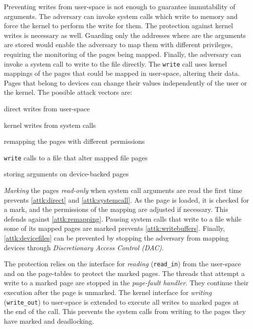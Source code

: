 \documentclass[conference]{IEEEtran}
\begin{document}
Preventing writes from user-space is not enough to guarantee immutability of
arguments. The adversary can invoke system calls which write to memory and force
the kernel to perform the write for them. The protection against kernel writes
is necessary as well. Guarding only the addresses where are the arguments are
stored would enable the adversary to map them with different privileges,
requiring the monitoring of the pages being mapped. Finally, the adversary can
invoke a system call to write to the file directly. The \texttt{write} call uses
kernel mappings of the pages that could be mapped in user-space, altering their
data. Pages that belong to devices can change their values independently of the 
user or the kernel. The possible attack vectors are:
\begin{enumerate*}[label=(\roman*)]
\item \label{attk:direct} direct writes from user-space
\item \label{attk:systemcall} kernel writes from system calls
\item \label{attk:remapping} remapping the pages with different permissions
\item \label{attk:writebuffers}\texttt{write} calls to a file that alter mapped file pages
\item \label{attk:devicefiles} storing arguments on device-backed pages
\end{enumerate*}

\emph{Marking} the pages \emph{read-only} when system call arguments are read
the first time prevents \autoref{attk:direct} and \autoref{attk:systemcall}.
As the page is loaded, it is checked for a mark, and the permissions of the 
mapping are adjusted if necessary. This defends against \autoref{attk:remapping}.
Pausing system calls that write to a file while some of its mapped pages are
marked prevents \autoref{attk:writebuffers}. Finally, \autoref{attk:devicefiles}
can be prevented by stopping the adversary from mapping devices through
\emph{Discretionary Access Control (DAC)}.

The protection relies on the interface for \emph{reading} (\texttt{read\_in})
from the user-space and on the page-tables to protect the marked pages. The
threads that attempt a write to a marked page are stopped in the
\emph{page-fault handler}. They continue their execution after the page is
unmarked. The kernel interface for \emph{writing} (\texttt{write\_out}) to
user-space is extended to execute all writes to marked pages at the end of the
call. This prevents the system calls from writing to the pages they have marked
and deadlocking.
\end{document}
